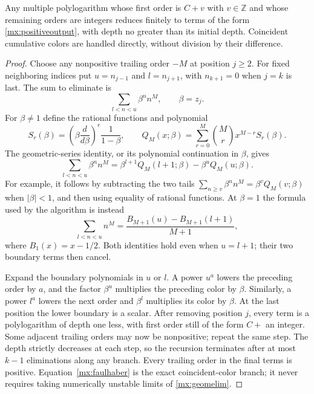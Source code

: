\begin{lemma}
\label{mx:eliminate}
Any multiple polylogarithm whose first order is $C+v$ with
$v\in\mathbb Z$ and whose remaining orders are integers reduces
finitely to terms of the form \eqref{mx:positiveoutput}, with depth
no greater than its initial depth.  Coincident cumulative colors are
handled directly, without division by their difference.
\end{lemma}

\begin{proof}
Choose any nonpositive trailing order $-M$ at position $j\geq2$.
For fixed neighboring indices put
$u=n_{j-1}$ and $l=n_{j+1}$, with $n_{k+1}=0$ when $j=k$ is last.
The sum to eliminate is
\[
 \sum_{l<n<u}\beta^n n^M,\qquad \beta=z_j.
\]
For $\beta\ne1$ define the rational functions and polynomial
\begin{equation}\label{mx:Q}
 S_r(\beta)=\left(\beta\frac d{d\beta}\right)^r
                         \frac1{1-\beta},\qquad
 Q_M(x;\beta)=\sum_{r=0}^M\binom Mr x^{M-r}S_r(\beta).
\end{equation}
The geometric-series identity, or its polynomial continuation in
$\beta$, gives
\begin{equation}\label{mx:geomelim}
 \sum_{l<n<u}\beta^n n^M
   =\beta^{l+1}Q_M(l+1;\beta)-\beta^uQ_M(u;\beta).
\end{equation}
For example, it follows by subtracting the two tails
$\sum_{n\geq v}\beta^n n^M=\beta^vQ_M(v;\beta)$ when
$|\beta|<1$, and then using equality of rational functions.  At
$\beta=1$ the formula used by the algorithm is instead
\begin{equation}\label{mx:faulhaber}
 \sum_{l<n<u}n^M
   =\frac{B_{M+1}(u)-B_{M+1}(l+1)}{M+1},
\end{equation}
where $B_1(x)=x-1/2$.  Both identities hold even when $u=l+1$;
their two boundary terms then cancel.

Expand the boundary polynomials in $u$ or $l$.  A power $u^a$ lowers
the preceding order by $a$, and the factor $\beta^u$ multiplies the
preceding color by $\beta$.  Similarly, a power $l^a$ lowers the next
order and $\beta^l$ multiplies its color by $\beta$.  At the last
position the lower boundary is a scalar.  After removing position
$j$, every term is a polylogarithm of depth one less, with first order
still of the form $C+$ an integer.  Some adjacent trailing orders
may now be nonpositive; repeat the same step.  The depth strictly
decreases at each step, so the recursion terminates after at most
$k-1$ eliminations along any branch.  Every trailing order in the
final terms is positive.  Equation~\eqref{mx:faulhaber} is the exact
coincident-color branch; it never requires taking numerically unstable
limits of \eqref{mx:geomelim}.
\end{proof}

